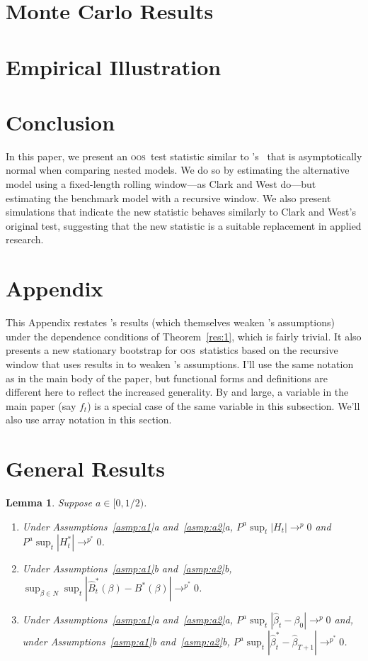\documentclass[12pt]{article}
\newcommand\citepos[2][]{\citeauthor{#2}'s \citeyearpar[#1]{#2}}
\newcommand\poscw{\citeauthor{ClW:06}'s \citeyearpar{ClW:06,ClW:07}}
\newtheorem{lema}{Lemma}[section]
\theoremstyle{definition}
\newcommand{\oos}{\textsc{oos}}
\begin{document}
\section{Monte Carlo Results}\label{sec:2}

\section{Empirical Illustration}\label{sec:3}

\section{Conclusion}\label{sec:4}
In this paper, we present an \oos\ test statistic similar to \poscw\
that is asymptotically normal when comparing nested models.  We do so
by estimating the alternative model using a fixed-length rolling
window---as Clark and West do---but estimating the benchmark model
with a recursive window.  We also present simulations that indicate
the new statistic behaves similarly to Clark and West's original test,
suggesting that the new statistic is a suitable replacement in applied
research.  

\appendix
\section*{Appendix}

This Appendix restates \citepos{Mcc:00} results (which themselves
weaken \citepos{Wes:96} assumptions) under the dependence conditions of
Theorem~\ref{res:1}, which is fairly trivial.  It also presents a new
stationary bootstrap for \oos\ statistics based on the recursive
window that uses results in \citet{GoJ:03} to weaken \citepos{CoS:07}
assumptions.  I'll use the same notation as in the main body of the
paper, but functional forms and definitions are different here to
reflect the increased generality.  By and large, a variable in the
main paper (say $f_t$) is a special case of the same variable in this
subsection.  We'll also use array notation in this section.

\section{General Results}

\begin{lema}\label{res:a2}
  Suppose $a \in [0,1/2)$.
  \begin{enumerate}
  \item Under Assumptions~\ref{asmp:a1}a and~\ref{asmp:a2}a, $P^a
    \sup_t | H_{t} | \to^p 0$ and $P^a \sup_t | H_{t}^{*} |
    \to^{p^{*}} 0$.
  \item Under Assumptions~\ref{asmp:a1}b and~\ref{asmp:a2}b,
    $\sup_{\beta \in N} \sup_t | \hat{B}_{t}^{*}(\beta) - B^{*}(\beta)
    | \to^{p^{*}} 0$.
  \item Under Assumptions~\ref{asmp:a1}a and~\ref{asmp:a2}a, $P^a
    \sup_t | \hat{\beta}_{t} - \beta_{0} | \to^{p} 0$ and, under
    Assumptions~\ref{asmp:a1}b and~\ref{asmp:a2}b, $P^a \sup_t |
    \hat{\beta}^{*}_{t} - \hat{\beta}_{T+1} | \to^{p^{*}} 0$.
  \end{enumerate}
\end{lema}
\end{document}
